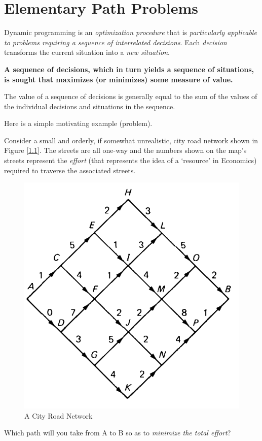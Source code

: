 \documentclass[english,notitlepage,smartquotes]{hgbreport}
\theoremstyle{definition}
\theoremstyle{definition}
\theoremstyle{remark}
\theoremstyle{definition}
\theoremstyle{plain}
\theoremstyle{definition}
\begin{document}
\tableofcontents

\chapter{Elementary Path Problems}

Dynamic programming is an \emph{optimization procedure} that is \emph{particularly applicable to problems requiring a sequence of interrelated decisions}. Each \emph{decision} transforms the current situation into a \emph{new situation}. 

\textbf{A sequence of decisions, which in turn yields a sequence of situations, is sought that maximizes (or minimizes) some measure of value.}

The value of a sequence of decisions is generally equal to the sum of the values of the individual decisions and situations in the sequence.

Here is a simple motivating example (problem).


Consider a small and orderly, if somewhat unrealistic, city road network shown in Figure [\ref{fig:cityroads}]. The streets are all one-way and the numbers shown on the map's streets represent the \emph{effort} (that represents the idea of a `resource' in Economics) required to traverse the associated streets. 
\begin{figure}[!h]
\begin{center}
\caption{A City Road Network}
\label{fig:cityroads}
\includegraphics[width=.345\textwidth]{elem-path-problem-1}
\end{center}
\end{figure}

Which path will you take from A to B so as to \emph{minimize the total effort}?
\end{document}
